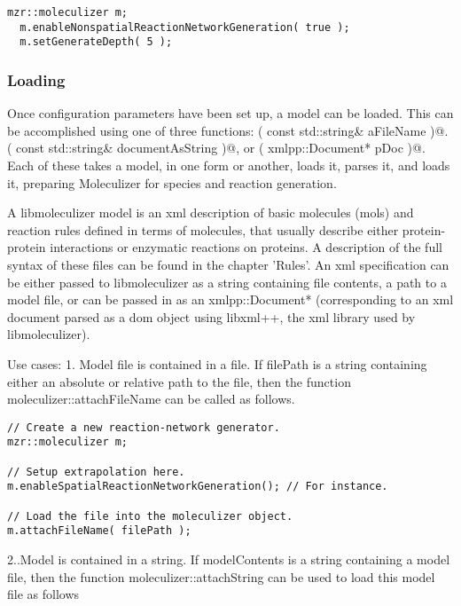 \lstset{language=C++}
\begin{lstlisting}[caption=Setting a non-default network generation depth]
  mzr::moleculizer m; 
  m.enableNonspatialReactionNetworkGeneration( true );
  m.setGenerateDepth( 5 );
\end{lstlisting}
  


\subsubsection{Loading}
Once configuration parameters have been set up, a model can be
loaded.  This can be accomplished using one of three functions:
\lstinline@attachFileName( const std::string& aFileName )@.
\lstinline@attachString( const std::string& documentAsString )@,
or \lstinline@attachDocument( xmlpp::Document* pDoc )@.  Each of these takes a
model, in one form or another, loads it, parses it, and loads it,
preparing Moleculizer for species and reaction generation.  

A libmoleculizer model is an xml description of basic molecules (mols) and
reaction rules defined in terms of molecules, that usually describe
either protein-protein interactions or enzymatic reactions on
proteins.  A description of the full syntax of these files can be
found in the chapter 'Rules'.  An xml specification can be either
passed to libmoleculizer as a string containing file contents, a path
to a model file, or can be passed in as an xmlpp::Document*
(corresponding to an xml document parsed as a dom object using
libxml++, the xml library used by libmoleculizer).

Use cases:
1.  Model file is contained in a file.
If filePath is a string containing either an absolute or relative path
to the file, then the function moleculizer::attachFileName can be
called as follows.  

\lstset{language=C++}
\begin{lstlisting}[caption=Loading a MZR file into a running
  moleculizer instance]
// Create a new reaction-network generator.
mzr::moleculizer m;

// Setup extrapolation here. 
m.enableSpatialReactionNetworkGeneration(); // For instance.

// Load the file into the moleculizer object.
m.attachFileName( filePath );
\end{lstlisting}

2..Model is contained in a string.
If modelContents is a string containing a model file, then the
function moleculizer::attachString can be used to load this model file
as follows

